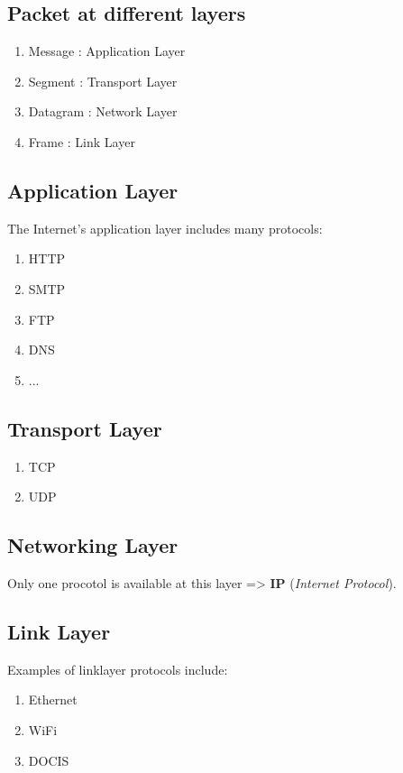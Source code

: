 \subsection{Packet at different layers}
\begin{enumerate}
    \item Message : Application Layer
    \item Segment : Transport Layer
    \item Datagram : Network Layer
    \item Frame : Link Layer
\end{enumerate}

\subsection{Application Layer}
The Internet’s application layer includes many protocols:
\begin{enumerate}
    \item HTTP
    \item SMTP
    \item FTP
    \item DNS
    \item ...
\end{enumerate}

\subsection{Transport Layer}
\begin{enumerate}
    \item TCP
    \item UDP
\end{enumerate}

\subsection{Networking Layer}
Only one procotol is available at this layer => \textbf{IP} (\textit{Internet Protocol}).

\subsection{Link Layer}
Examples of linklayer protocols include:
\begin{enumerate}
    \item Ethernet
    \item WiFi
    \item DOCIS
\end{enumerate}

